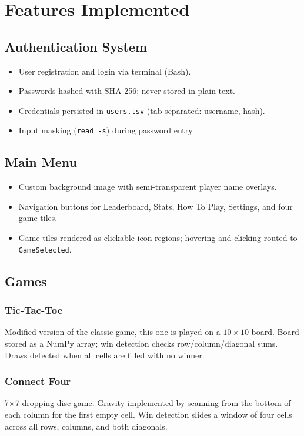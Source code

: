 \documentclass[12pt,a4paper]{article}
\begin{document}
\section{Features Implemented}

\subsection{Authentication System}
\begin{itemize}[leftmargin=2em]
  \item User registration and login via terminal (Bash).
  \item Passwords hashed with SHA-256; never stored in plain text.
  \item Credentials persisted in \texttt{users.tsv} (tab-separated: username, hash).
  \item Input masking (\texttt{read -s}) during password entry.
\end{itemize}

\subsection{Main Menu}
\begin{itemize}[leftmargin=2em]
  \item Custom background image with semi-transparent player name overlays.
  \item Navigation buttons for Leaderboard, Stats, How To Play, Settings, and four game tiles.
  \item Game tiles rendered as clickable icon regions; hovering and clicking routed to \texttt{GameSelected}.
\end{itemize}

\subsection{Games}

\subsubsection{Tic-Tac-Toe}
Modified version of the classic game, this one is played on a $10\times10$ board. Board stored as a NumPy array; win detection checks row/column/diagonal sums. Draws detected when all cells are filled with no winner.

\subsubsection{Connect Four}
7$\times$7 dropping-disc game. Gravity implemented by scanning from the bottom of each column for the first empty cell. Win detection slides a window of four cells across all rows, columns, and both diagonals.
\end{document}
